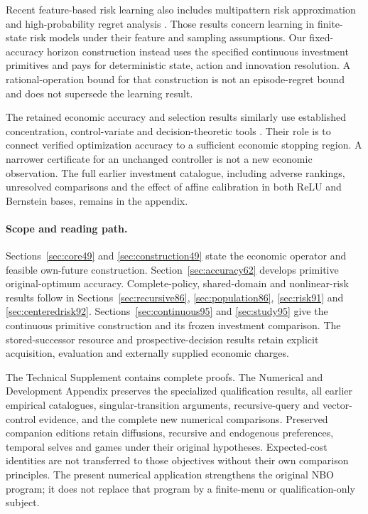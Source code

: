 \documentclass[ecta,nameyear,draft]{econsocart}
\begin{document}
Recent feature-based risk learning also includes multipattern risk approximation and high-probability regret analysis \citep{ruszczynskizhang2026}. Those results concern learning in finite-state risk models under their feature and sampling assumptions. Our fixed-accuracy horizon construction instead uses the specified continuous investment primitives and pays for deterministic state, action and innovation resolution. A rational-operation bound for that construction is not an episode-regret bound and does not supersede the learning result.

The retained economic accuracy and selection results similarly use established concentration, control-variate and decision-theoretic tools \citep{munos2006variance,jiang2016,howard2020time,karampatziakis2021,manski2004,floyd1962}. Their role is to connect verified optimization accuracy to a sufficient economic stopping region. A narrower certificate for an unchanged controller is not a new economic observation. The full earlier investment catalogue, including adverse rankings, unresolved comparisons and the effect of affine calibration in both ReLU and Bernstein bases, remains in the appendix.

\paragraph{Scope and reading path.}
Sections~\ref{sec:core49} and \ref{sec:construction49} state the economic operator and feasible own-future construction. Section~\ref{sec:accuracy62} develops primitive original-optimum accuracy. Complete-policy, shared-domain and nonlinear-risk results follow in Sections~\ref{sec:recursive86}, \ref{sec:population86}, \ref{sec:risk91} and \ref{sec:centeredrisk92}. Sections~\ref{sec:continuous95} and \ref{sec:study95} give the continuous primitive construction and its frozen investment comparison. The stored-successor resource and prospective-decision results retain explicit acquisition, evaluation and externally supplied economic charges.

The Technical Supplement contains complete proofs. The Numerical and Development Appendix preserves the specialized qualification results, all earlier empirical catalogues, singular-transition arguments, recursive-query and vector-control evidence, and the complete new numerical comparisons. Preserved companion editions retain diffusions, recursive and endogenous preferences, temporal selves and games under their original hypotheses. Expected-cost identities are not transferred to those objectives without their own comparison principles. The present numerical application strengthens the original NBO program; it does not replace that program by a finite-menu or qualification-only subject.
\end{document}
